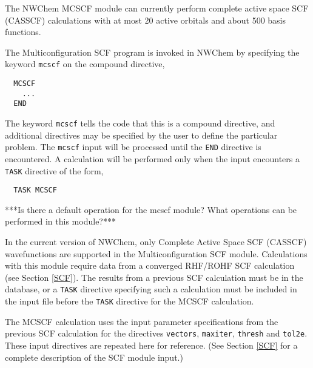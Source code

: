 \label{sec:mcscf}
The NWChem MCSCF module can currently perform complete active space
SCF (CASSCF) calculations with at most 20 active orbitals and about
500 basis functions.

The Multiconfiguration SCF program is invoked in NWChem 
by specifying the keyword \verb+mcscf+ on the compound directive,

\begin{verbatim}
  MCSCF
    ...
  END
\end{verbatim}

The keyword \verb+mcscf+ tells the code that this is a compound directive,
and additional directives may be specified by the user to define the particular
problem.  The \verb+mcscf+ input will be processed until the
\verb+END+ directive is encountered.  A calculation will be performed 
only when the input encounters a \verb+TASK+ directive of the form,

\begin{verbatim}
  TASK MCSCF
\end{verbatim}

\Large
***Is there a default operation for the mcscf module?  What operations
can be performed in this module?***
\normalsize


In the current version of NWChem, only Complete Active Space SCF (CASSCF) 
wavefunctions are supported in the Multiconfiguration SCF module.  Calculations
with this module require data from a converged  RHF/ROHF SCF calculation
(see Section \ref{SCF}).  The results from a previous SCF calculation must be
in the database, or a \verb+TASK+ directive specifying such a calculation
must be included in the input file before the \verb+TASK+ directive for
the MCSCF calculation.

The MCSCF calculation uses the input parameter specifications from the
previous SCF calculation for the directives \verb+vectors+, \verb+maxiter+,
\verb+thresh+ and \verb+tol2e+.  These  input directives 
are repeated here for reference.  (See Section \ref{SCF} for a complete
description of the SCF module input.)


